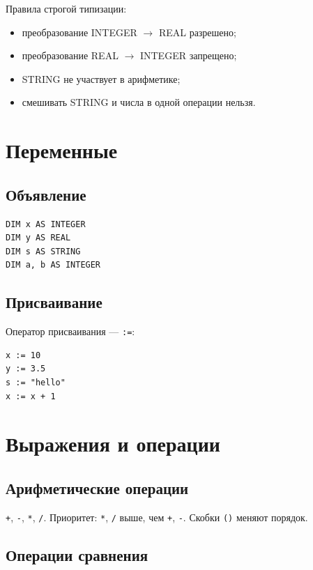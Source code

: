 \documentclass[14pt,a4paper]{article}
\begin{document}
Правила строгой типизации:
\begin{itemize}
  \item преобразование INTEGER $\to$ REAL разрешено;
  \item преобразование REAL $\to$ INTEGER запрещено;
  \item STRING не участвует в арифметике;
  \item смешивать STRING и числа в одной операции нельзя.
\end{itemize}

\section{Переменные}

\subsection{Объявление}

\begin{lstlisting}[language={},numbers=none]
DIM x AS INTEGER
DIM y AS REAL
DIM s AS STRING
DIM a, b AS INTEGER
\end{lstlisting}

\subsection{Присваивание}

Оператор присваивания — \texttt{:=}:
\begin{lstlisting}[language={},numbers=none]
x := 10
y := 3.5
s := "hello"
x := x + 1
\end{lstlisting}

\section{Выражения и операции}

\subsection{Арифметические операции}

\texttt{+}, \texttt{-}, \texttt{*}, \texttt{/}. Приоритет:
\texttt{*}, \texttt{/} выше, чем \texttt{+}, \texttt{-}. Скобки
\texttt{()} меняют порядок.

\subsection{Операции сравнения}
\end{document}
